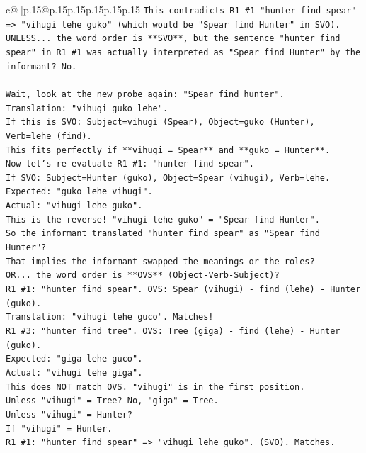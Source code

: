\documentclass{article}
\begin{document}
{\begin{supertabular}{c@{$\;$}|p{.15\linewidth}@{}p{.15\linewidth}p{.15\linewidth}p{.15\linewidth}p{.15\linewidth}p{.15\linewidth}}
{{{\texttt{This contradicts R1 \#1 "hunter find spear" => "vihugi lehe guko" (which would be "Spear find Hunter" in SVO).} \\
\texttt{UNLESS... the word order is **SVO**, but the sentence "hunter find spear" in R1 \#1 was actually interpreted as "Spear find Hunter" by the informant? No.} \\
\\ 
\texttt{Wait, look at the new probe again: "Spear find hunter".} \\
\texttt{Translation: "vihugi guko lehe".} \\
\texttt{If this is SVO: Subject=vihugi (Spear), Object=guko (Hunter), Verb=lehe (find).} \\
\texttt{This fits perfectly if **vihugi = Spear** and **guko = Hunter**.} \\
\texttt{Now let's re{-}evaluate R1 \#1: "hunter find spear".} \\
\texttt{If SVO: Subject=Hunter (guko), Object=Spear (vihugi), Verb=lehe.} \\
\texttt{Expected: "guko lehe vihugi".} \\
\texttt{Actual: "vihugi lehe guko".} \\
\texttt{This is the reverse! "vihugi lehe guko" = "Spear find Hunter".} \\
\texttt{So the informant translated "hunter find spear" as "Spear find Hunter"?} \\
\texttt{That implies the informant swapped the meanings or the roles?} \\
\texttt{OR... the word order is **OVS** (Object{-}Verb{-}Subject)?} \\
\texttt{R1 \#1: "hunter find spear". OVS: Spear (vihugi) {-} find (lehe) {-} Hunter (guko).} \\
\texttt{Translation: "vihugi lehe guco". Matches!} \\
\texttt{R1 \#3: "hunter find tree". OVS: Tree (giga) {-} find (lehe) {-} Hunter (guko).} \\
\texttt{Expected: "giga lehe guco".} \\
\texttt{Actual: "vihugi lehe giga".} \\
\texttt{This does NOT match OVS. "vihugi" is in the first position.} \\
\texttt{Unless "vihugi" = Tree? No, "giga" = Tree.} \\
\texttt{Unless "vihugi" = Hunter?} \\
\texttt{If "vihugi" = Hunter.} \\
\texttt{R1 \#1: "hunter find spear" => "vihugi lehe guko". (SVO). Matches.} \\
}}}
\end{supertabular}}
\end{document}

